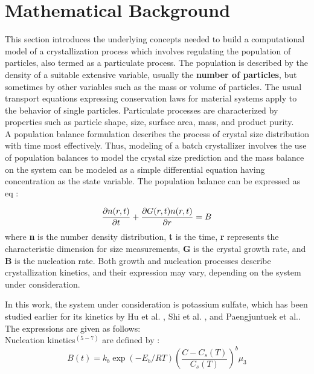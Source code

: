 \documentclass[3p,times]{elsarticle}
\begin{document}
\section{Mathematical Background} \label{model}
This section introduces the underlying concepts needed to build a computational model of a crystallization process which involves regulating the population of particles, also termed as a particulate process. 
The population is described by the density of a suitable extensive variable, usually the \textbf{number of particles}, but sometimes by other variables such as the mass or volume of particles. The usual transport equations expressing conservation laws for material systems apply to the behavior of single particles. Particulate processes are characterized by properties such as particle shape, size, surface area, mass, and product purity. \\
A population balance formulation describes the process of crystal size distribution with time most effectively. Thus, modeling of a batch crystallizer involves the use of population balances to model the crystal size prediction and the mass balance on the system can be modeled as a simple differential equation having concentration as the state variable.
The population balance can be expressed as eq :

\begin{equation} \label{populationbalance}
	\frac{\partial{n(r,t)}}{\partial{t}} + \frac{\partial{G(r,t)n(r,t)}}{\partial{r}} = B  \nolinebreak
\end{equation}
where \textbf{n} is the number density distribution, \textbf{t} is the time, \textbf{r} represents the characteristic dimension for size measurements, \textbf{G} is the crystal growth rate, and \textbf{B} is the nucleation rate. Both growth and nucleation processes describe crystallization kinetics, and their expression may vary, depending on the system under consideration.

In this work, the system under consideration is potassium sulfate, which has been studied earlier for its kinetics by Hu et al. \cite{hu}, Shi et al. \cite{shi}, and Paengjuntuek et al.\cite{paeng}. The expressions are given as follows: \\

Nucleation kinetics$^{(5-7)}$ are defined by :
\begin{equation}
B(t) = k_{b}\exp{\left(-E_{b}/RT \right)}\left(\frac{C - C_{s}(T)}{C_{s}(T)}\right)^{b}\mu_{3}
\end{equation}  
\end{document}
